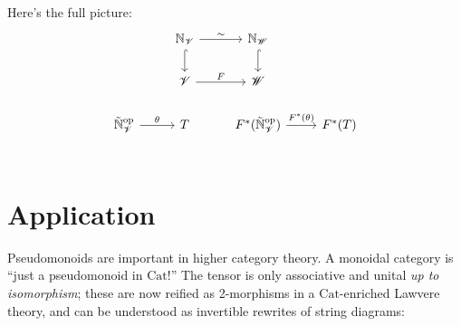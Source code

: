 \documentclass[a4paper,UKenglish]{article}
\theoremstyle{definition}
\newcommand{\Cat}{\mathrm{Cat}}
\newcommand{\op}{\mathrm{op}}
\newcommand{\NN}{\mathbb{N}}
\newcommand{\V}{\mathscr{V}}
\newcommand{\W}{\mathscr{W}}
\begin{document}

Here's the full picture:\\
\[\begin{tikzcd}
	& \NN_\V \arrow[hookrightarrow]{d} \arrow["\sim"]{r} & \NN_\W \arrow[hookrightarrow]{d}\\
	& \V \arrow["F"]{r} & \W\\
	\tilde{\NN}_\V^\op \arrow["\theta"]{r} & T & F^*(\tilde{\NN}_\V^\op) \arrow["F^*(\theta)"]{r} & F^*(T)\\
\end{tikzcd}\]

\section{Application}
Pseudomonoids \cite{pseudo} are important in higher category theory. A monoidal category is ``just a pseudomonoid in $\Cat$!'' The tensor is only associative and unital \textit{up to isomorphism}; these are now reified as 2-morphisms in a $\Cat$-enriched Lawvere theory, and can be understood as invertible rewrites of string diagrams:
\end{document}
